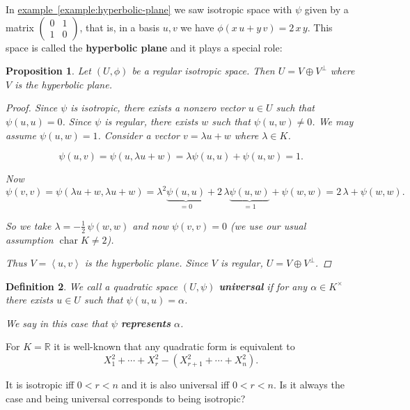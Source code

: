 \documentclass{article}
\newcommand{\term}{\textbf}
\DeclareMathOperator{\fchar}{char}
\newcommand{\refref}[2]{\hyperref[#2]{#1~\ref*{#2}}}
\newcommand{\examplesymbol}{$\blacktriangle$}
\renewcommand{\qedsymbol}{$\blacksquare$}
\theoremstyle{myplain}
\newtheorem{proposition}{Proposition}[section]
\theoremstyle{mydefinition}
\newtheorem{definition}[proposition]{Definition}
\newenvironment{example}
  {\pushQED{\qed}\renewcommand{\qedsymbol}{\examplesymbol}\examplex}
  {\popQED\endexamplex}
\begin{document}
In \refref{example}{example:hyperbolic-plane} we saw isotropic space with $\psi$
given by a matrix $\begin{pmatrix}
  0 & 1 \\
  1 & 0
\end{pmatrix}$, that is, in a basis $u,v$ we have
$\phi (x\,u + y\,v) = 2\,x\,y$. This space is called the \term{hyperbolic plane}
and it plays a special role:

\begin{proposition}
  Let $(U,\phi)$ be a regular isotropic space. Then $U = V \oplus V^\perp$ where
  $V$ is the hyperbolic plane.

  \begin{proof}
    Since $\psi$ is isotropic, there exists a nonzero vector $u \in U$ such that
    $\psi (u,u) = 0$. Since $\psi$ is regular, there exists $w$ such that
    $\psi (u,w) \ne 0$. We may assume $\psi (u,w) = 1$. Consider a vector
    $v = \lambda u + w$ where $\lambda \in K$.

    \[ \psi (u,v) = \psi (u, \lambda u + w) = \lambda \psi (u,u) + \psi (u,w) = 1. \]

    Now
    \[ \psi (v,v) = \psi (\lambda u + w, \lambda u + w) =
      \lambda^2 \underbrace{\psi (u,u)}_{=0} +
      2\,\lambda \underbrace{\psi (u, w)}_{=1} +
      \psi (w, w) = 2\,\lambda + \psi (w,w). \]

    So we take $\lambda = -\frac{1}{2} \, \psi (w,w)$ and now $\psi (v,v) = 0$
    (we use our usual assumption $\fchar K \ne 2$).

    Thus $V = \left<u,v\right>$ is the hyperbolic plane. Since $V$ is regular,
    $U = V \oplus V^\perp$.
  \end{proof}
\end{proposition}

\begin{definition}
  We call a quadratic space $(U,\psi)$ \term{universal} if for any
  $\alpha\in K^\times$ there exists $u\in U$ such that $\psi (u,u) = \alpha$.

  We say in this case that $\psi$ \term{represents} $\alpha$.
\end{definition}

\begin{example}
  For $K = \mathbb{R}$ it is well-known that any quadratic form is equivalent to
  \[ X_1^2 + \cdots + X_r^2 - (X_{r+1}^2 + \cdots + X_n^2). \]

  It is isotropic iff $0 < r < n$ and it is also universal iff $0 < r < n$.
  Is it always the case and being universal corresponds to being isotropic?
\end{example}
\end{document}
